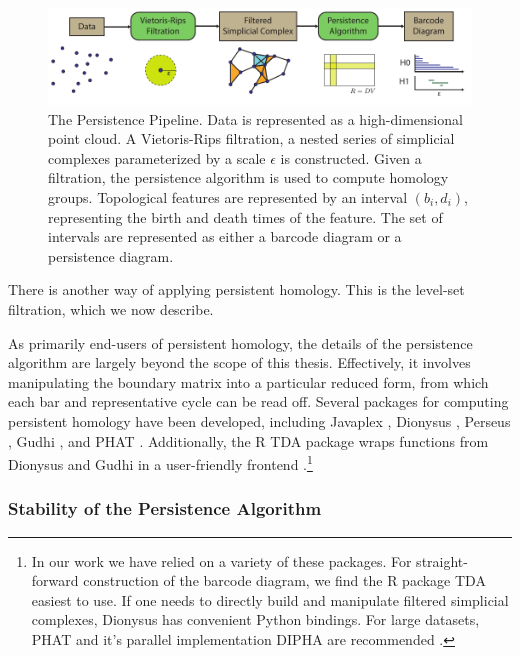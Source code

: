 \begin{figure}[t]
	\centering
	\includegraphics[]{./fig/background/persistence_pipeline.pdf}
	\caption[The Persistence Pipeline]{The Persistence Pipeline. Data is represented as a high-dimensional point cloud. A Vietoris-Rips filtration, a nested series of simplicial complexes parameterized by a scale $\epsilon$ is constructed. Given a filtration, the persistence algorithm is used to compute homology groups. Topological features are represented by an interval $(b_i, d_i)$, representing the birth and death times of the feature. The set of intervals are represented as either a barcode diagram or a persistence diagram.}
	\label{fig:bg:persistence_pipeline}
\end{figure}

There is another way of applying persistent homology.
This is the level-set filtration, which we now describe.

As primarily end-users of persistent homology, the details of the persistence algorithm are largely beyond the scope of this thesis.
Effectively, it involves manipulating the boundary matrix into a particular reduced form, from which each bar and representative cycle can be read off.
Several packages for computing persistent homology have been developed, including Javaplex \cite{Tausz:2011}, Dionysus \cite{Morozov:2012}, Perseus \cite{Nanda:2013}, Gudhi \cite{maria:hal-01108461}, and PHAT \cite{Bauer:PHAT:2015}.
Additionally, the R TDA package wraps functions from Dionysus and Gudhi in a user-friendly frontend \cite{Fasy:TDA:2015}.\footnote{In our work we have relied on a variety of these packages. For straight-forward construction of the barcode diagram, we find the R package TDA easiest to use. If one needs to directly build and manipulate filtered simplicial complexes, Dionysus has convenient Python bindings. For large datasets, PHAT and it's parallel implementation DIPHA are recommended \cite{Bauer:DIPHA:2015,Bauer:2014gd}.}

\subsubsection{Stability of the Persistence Algorithm}
\label{bg:tda:ph:stability}

